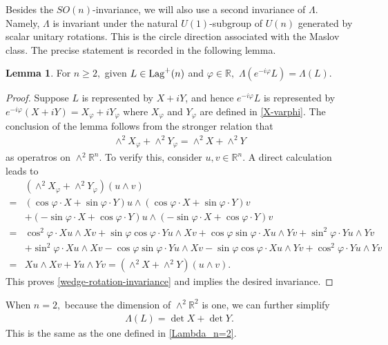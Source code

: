 \documentclass[11pt]{amsart}
\numberwithin{equation}{section}
\theoremstyle{definition}
\theoremstyle{definition}
\newtheorem{lemma}[equation]{Lemma}
\newcommand{\pr}[1]{\left(#1\right)}
\newcommand{\bb}[1]{\mathbb{#1}} \newcommand{\td}[1]{\widetilde{#1}}
\begin{document}
Besides the ${SO}(n)$-invariance, we will also use a second invariance of \(\Lambda\). 
Namely, \(\Lambda\) is invariant under the natural ${U}(1)$-subgroup of ${U}(n)$ generated by scalar unitary rotations. 
This is the circle direction associated with the Maslov class. 
The precise statement is recorded in the following lemma.

\begin{lemma}
	\label{lem:Lambda-rot-inv}
	For $n\ge 2,$ given $L\in{\rm Lag}^+(n)$ and $\varphi\in\bb R,$
	$\Lambda\pr{e^{-i\varphi}L}
	= \Lambda\pr{L}.$
\end{lemma}

\begin{proof} 
	Suppose $L$ is represented by $X+iY$, and hence $e^{-i\varphi}L$ is represented by $e^{-i\varphi}(X+iY)=X_\varphi+iY_\varphi$ where $X_\varphi$ and $Y_\varphi$ are defined in \eqref{X-varphi}.
	The conclusion of the lemma follows from the stronger relation that
	\begin{align}
	\label{wedge-rotation-invariance}
	\wedge^2 X_\varphi + \wedge^2 Y_\varphi=\wedge^2 X + \wedge^2 Y
	\end{align}
	as operatros on $\wedge^2\bb R^n.$
	To verify this, consider $u,v\in\bb R^n.$ 
	A direct calculation leads to
	\begin{align*}
	&\pr{\wedge^2 X_\varphi + \wedge^2 Y_\varphi}(u\wedge v)\\
	= & \pr{\cos\varphi\cdot X + \sin\varphi\cdot Y}u \wedge \pr{\cos\varphi\cdot X + \sin\varphi\cdot Y} v\\
	&+ \pr{-\sin\varphi\cdot X + \cos\varphi\cdot Y}u \wedge \pr{-\sin\varphi\cdot X + \cos\varphi\cdot Y}v\\
	= & \cos^2 \varphi \cdot Xu\wedge Xv
	+ \sin\varphi\cos\varphi\cdot Yu\wedge Xv
	+ \cos\varphi\sin\varphi\cdot Xu\wedge Yv
	+ \sin^2\varphi\cdot Yu\wedge Yv\\
	& + \sin^2 \varphi \cdot Xu\wedge Xv
	- \cos\varphi\sin\varphi\cdot Yu\wedge Xv
	- \sin\varphi\cos\varphi\cdot Xu\wedge Yv
	+ \cos^2\varphi\cdot Yu\wedge Yv\\
	= & Xu\wedge Xv + Yu\wedge Yv
	= \pr{\wedge^2 X + \wedge^2 Y}(u\wedge v).
	\end{align*}
	This proves \eqref{wedge-rotation-invariance} and implies the desired invariance.
\end{proof}


When $n=2,$ because the dimension of $\wedge^2\bb R^2$ is one, we can further simplify
\begin{align}
\label{Lambda-two-dim}
\Lambda\pr{L}= \det X + \det Y.
\end{align}
This is the same as the one defined in \eqref{Lambda_n=2}.
\end{document}
